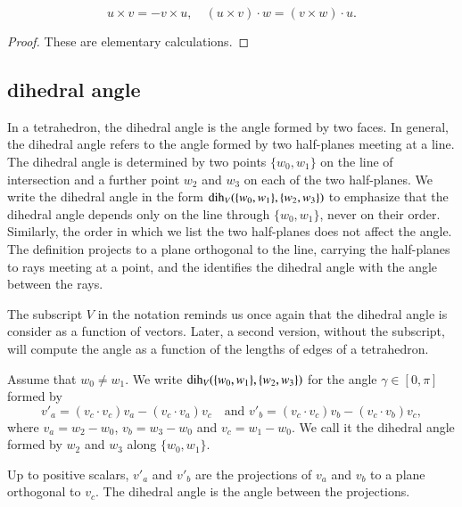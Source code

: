 \begin{lemma}
    $$
    u\times v = -v\times u,\quad
    (u\times v)\cdot w = (v\times w)\cdot u.
    $$
\end{lemma}

\begin{proof} These are elementary calculations.
\end{proof}



\subsection{dihedral angle}

In a tetrahedron, the dihedral angle is
the angle formed by two faces.  In general,
the dihedral angle refers to the angle formed by two half-planes
meeting at a line.  The dihedral angle is determined
by two points $\{w_0,w_1\}$ on the line of intersection
and a further point $w_2$ and $w_3$ on each of the two half-planes.
We write the dihedral angle in the form $\operatorname{dih}_V(\{w_0,w_1\},\{w_2,w_3\})$ to emphasize that the dihedral angle depends only
on the line through $\{w_0,w_1\}$, never on their order.
Similarly, the order in which we list 
the two half-planes does not affect
the angle.  The definition projects
to a plane orthogonal to the line, carrying
the half-planes to rays meeting at a point, and
the identifies the dihedral angle with the angle
between the rays.  

The subscript $V$ in the notation reminds us
once again that the dihedral angle is consider as a function of 
vectors.  Later, a second version, without the subscript, will
compute the angle as a function of the lengths of edges of a 
tetrahedron.



\begin{definition}\label{def:dih} Assume that $w_0\ne w_1$.
We write $\operatorname{dih}_V(\{w_0,w_1\},\{w_2,w_3\})$ for the angle $\gamma\in[0,\pi]$
formed
by 
    $$
    v'_a = (v_c\cdot v_c) v_a - (v_c\cdot v_a) v_c\quad\text{and }v'_b =
            (v_c\cdot v_c) v_b - (v_c\cdot v_b) v_c,
    $$
where $v_a = w_2-w_0$, $v_b=w_3-w_0$ and $v_c=w_1-w_0$.  We call it
the dihedral angle formed by $w_2$ and $w_3$ along $\{w_0,w_1\}$.
\end{definition}

Up to positive scalars, $v'_a$ and $v'_b$ are the projections of
$v_a$ and $v_b$ to a plane orthogonal to $v_c$.  The
dihedral angle is the angle between the projections.

